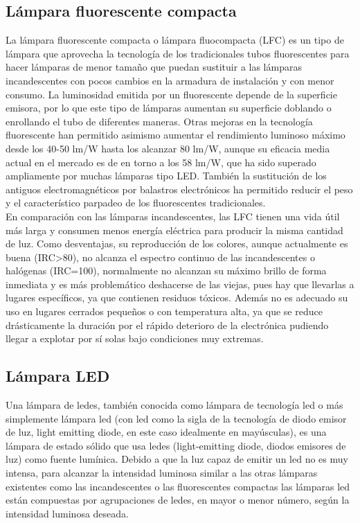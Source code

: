 \documentclass[]{article}
\begin{document}
\subsection{Lámpara fluorescente compacta}

La lámpara fluorescente compacta o lámpara fluocompacta (LFC) es un tipo de lámpara que aprovecha la tecnología de los tradicionales tubos fluorescentes para hacer lámparas de menor tamaño que puedan sustituir a las lámparas incandescentes con pocos cambios en la armadura de instalación y con menor consumo. La luminosidad emitida por un fluorescente depende de la superficie emisora, por lo que este tipo de lámparas aumentan su superficie doblando o enrollando el tubo de diferentes maneras. Otras mejoras en la tecnología fluorescente han permitido asimismo aumentar el rendimiento luminoso máximo desde los 40-50 lm/W hasta los alcanzar 80 lm/W, aunque su eficacia media actual en el mercado es de en torno a los 58 lm/W, que ha sido superado ampliamente por muchas lámparas tipo LED. También la sustitución de los antiguos electromagnéticos por balastros electrónicos ha permitido reducir el peso y el característico parpadeo de los fluorescentes tradicionales.\citep{LamparaFLuorescente}\\

En comparación con las lámparas incandescentes, las LFC tienen una vida útil más larga y consumen menos energía eléctrica para producir la misma cantidad de luz. Como desventajas, su reproducción de los colores, aunque actualmente es buena (IRC>80), no alcanza el espectro continuo de las incandescentes o halógenas (IRC=100), normalmente no alcanzan su máximo brillo de forma inmediata y es más problemático deshacerse de las viejas, pues hay que llevarlas a lugares específicos, ya que contienen residuos tóxicos. Además no es adecuado su uso en lugares cerrados pequeños o con temperatura alta, ya que se reduce drásticamente la duración por el rápido deterioro de la electrónica pudiendo llegar a explotar por sí solas bajo condiciones muy extremas.\citep{LamparaFLuorescente}\\

\subsection{Lámpara LED}

Una lámpara de ledes, también conocida como lámpara de tecnología led o más simplemente lámpara led (con led como la sigla de la tecnología de diodo emisor de luz, light emitting diode, en este caso idealmente en mayúsculas), es una lámpara de estado sólido que usa ledes (light-emitting diode, diodos emisores de luz) como fuente lumínica. Debido a que la luz capaz de emitir un led no es muy intensa, para alcanzar la intensidad luminosa similar a las otras lámparas existentes como las incandescentes o las fluorescentes compactas las lámparas led están compuestas por agrupaciones de ledes, en mayor o menor número, según la intensidad luminosa deseada.\citep{LamparaLED}
\end{document}

